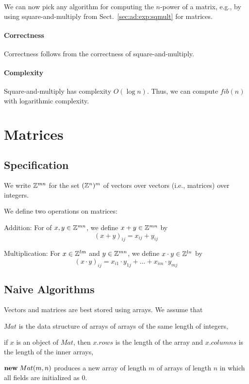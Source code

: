 We can now pick any algorithm for computing the $n$-power of a matrix, e.g., by using square-and-multiply from Sect.~\ref{sec:ad:exp:sqmult} for matrices.

\paragraph{Correctness}
Correctness follows from the correctness of square-and-multiply.

\paragraph{Complexity}
Square-and-multiply has complexity $O(\log n)$.
Thus, we can compute $fib(n)$ with logarithmic complexity.

\section{Matrices}

\subsection{Specification}

We write $\mathbb{Z}^{mn}$ for the set $(\mathbb{Z}^n)^m$ of vectors over vectors (i.e., matrices) over integers.

We define two operations on matrices:
\begin{compactitem}
\item Addition: For of $x,y\in \mathbb{Z}^{mn}$, we define $x+y\in\mathbb{Z}^{mn}$ by
\[(x+y)_{ij}=x_{ij}+y_{ij}\]

\item Multiplication: For $x\in \mathbb{Z}^{lm}$ and $y\in \mathbb{Z}^{mn}$, we define $x\cdot y\in\mathbb{Z}^{ln}$ by
\[(x\cdot y)_{ij}=x_{i1}\cdot y_{1j} +\ldots +x_{im}\cdot y_{mj}\]
\end{compactitem}


\subsection{Naive Algorithms}

Vectors and matrices are best stored using arrays.
We assume that
\begin{compactitem}
 \item $Mat$ is the data structure of arrays of arrays of the same length of integers,
 \item if $x$ is an object of $Mat$, then $x.rows$ is the length of the array and $x.columns$ is the length of the inner arrays,
 \item ${\rm \bf new}\; Mat(m,n)$ produces a new array of length $m$ of arrays of length $n$ in which all fields are initialized as $0$.
\end{compactitem}

